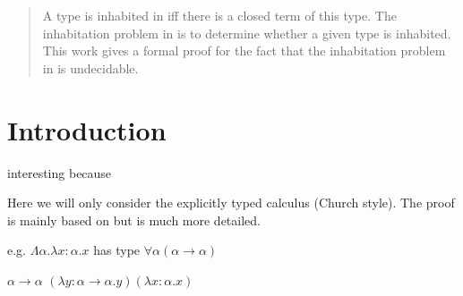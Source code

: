 \begin{abstract}
A type is inhabited in \lambdaTwo{} iff there is a closed \lambdaTwo{} term of this type. The inhabitation problem in \lambdaTwo{} is to determine whether a given \lambdaTwo{} type is inhabited. This work gives a formal proof for the fact that the inhabitation problem in \lambdaTwo{} is undecidable.
\end{abstract}

\section{Introduction}\label{sec.1}

interesting because


Here we will only consider the explicitly typed \lambdaTwo{} calculus (Church style). 
The proof is mainly based on \cite{2} but is much more detailed.

e.g. $\Lambda\alpha.\lambda x:\alpha.x$ has type $\forall\alpha(\alpha\to\alpha)$

$\alpha\to\alpha$ $(\lambda y:\alpha\to\alpha.y)(\lambda x:\alpha.x)$